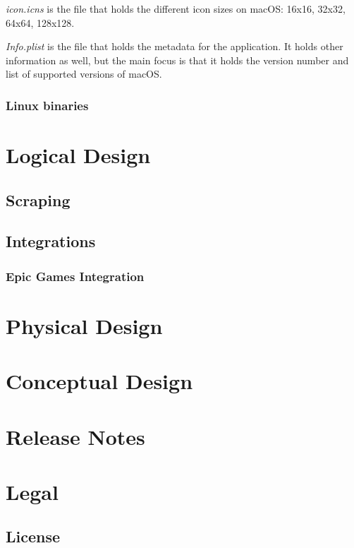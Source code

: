 \documentclass[letterpaper,12pt]{article}
\begin{document}
\textit{icon.icns} is the file that holds the different icon sizes on
macOS: 16x16, 32x32, 64x64, 128x128.

\textit{Info.plist} is the file that holds the metadata for the
application. It holds other information as well, but the main focus
is that it holds the version number and list of supported versions of macOS.

\subsubsection{Linux binaries}



\section{Logical Design}
\label{sec:LogicalDesign}
\subsection{Scraping}
\label{subsec:Scraping}
\subsection{Integrations}
\label{subsec:Integrations}
\subsubsection{Epic Games Integration}
\label{subsubsec:EpicInt}
\section{Physical Design}
\section{Conceptual Design}
\section{Release Notes}
\section{Legal}
\subsection{License}
\end{document}
